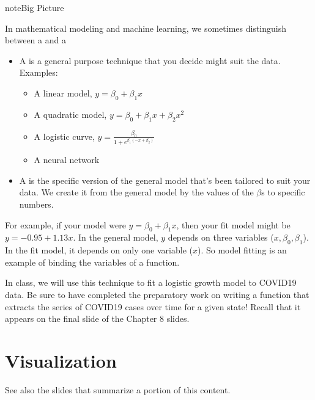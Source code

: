 \documentclass[letterpaper,10pt,english]{sphinxmanual}
\begin{document}
\begin{sphinxadmonition}{note}{Big Picture}

In mathematical modeling and machine learning, we sometimes distinguish between a  and a 
\begin{itemize}
\item {} 
A  is a general purpose technique that you decide might suit the data.  Examples:
\begin{itemize}
\item {} 
A linear model, \(y=\beta_0+\beta_1x\)

\item {} 
A quadratic model, \(y=\beta_0+\beta_1x+\beta_2x^2\)

\item {} 
A logistic curve, \(y=\frac{\beta_0}{1+e^{\beta_1(-x+\beta_2)}}\)

\item {} 
A neural network

\end{itemize}

\item {} 
A  is the specific version of the general model that’s been tailored to suit your data.  We create it from the general model by  the values of the \(\beta\)s to specific numbers.

\end{itemize}

For example, if your model were \(y=\beta_0+\beta_1x\), then your fit model might be \(y=-0.95+1.13x\).  In the general model, \(y\) depends on three variables (\(x,\beta_0,\beta_1\)).  In the fit model, it depends on only one variable (\(x\)).  So model fitting is an example of binding the variables of a function.
\end{sphinxadmonition}

In class, we will use this technique to fit a logistic growth model to COVID\sphinxhyphen{}19 data.  Be sure to have completed the preparatory work on writing a function that extracts the series of COVID\sphinxhyphen{}19 cases over time for a given state!  Recall that it appears on the final slide of the Chapter 8 slides.


\chapter{Visualization}
\label{\detokenize{chapter-10-visualization:visualization}}\label{\detokenize{chapter-10-visualization::doc}}
See also the slides that summarize a portion of this content.
\end{document}
